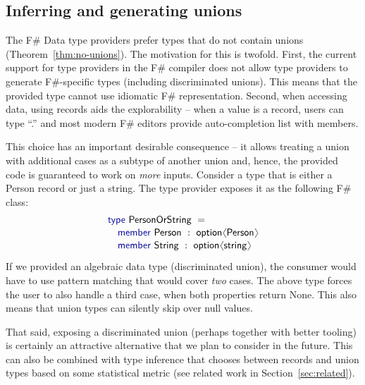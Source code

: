 \documentclass[10pt,preprint,blind,clearpagebib]{sigplanconf}
\newcommand{\langl}{\begin{picture}(4.5,7)
\put(1.1,2.5){\rotatebox{60}{\line(1,0){5.5}}}
\put(1.1,2.5){\rotatebox{300}{\line(1,0){5.5}}}
\end{picture}}
\newcommand{\rangl}{\begin{picture}(4.5,7)
\put(.9,2.5){\rotatebox{120}{\line(1,0){5.5}}}
\put(.9,2.5){\rotatebox{240}{\line(1,0){5.5}}}
\end{picture}}
\newcommand{\kvd}[1]{\textnormal{\textcolor{kvdclr}{\sffamily #1}}}
\newcommand{\ident}[1]{\textnormal{\sffamily #1}}
\begin{document}
  
\subsection{Inferring and generating unions}
\label{sec:impl-unions}

The F\# Data type providers prefer types that do not contain unions (Theorem~\ref{thm:no-unions}).
The motivation for this is twofold. First, the current support for type providers in the F\# compiler
does not allow type providers to generate F\#-specific types (including discriminated unions). This
means that the provided type cannot use idiomatic F\# representation. Second, when accessing data,
using records aids the explorability -- when a value is a record, users can type ``.'' and most modern
F\# editors provide auto-completion list with members. 

This choice has an important desirable consequence -- it allows treating a union with additional 
cases as a subtype of another union and, hence, the provided code is guaranteed to work on \emph{more}
inputs. Consider a type that is either a \ident{Person} record or just a string. 
The type provider exposes it as the following F\# class:
%
\begin{equation*}
\begin{array}{l}
 \kvd{type}~\ident{PersonOrString}~=  \\[0.1em]
 \quad \kvd{member}~\ident{Person}~:~\ident{option}\langl \ident{Person}\rangl \\[0.1em]
 \quad \kvd{member}~\ident{String}~:~\ident{option}\langl \ident{string}\rangl \\[0.1em]
\end{array}
\end{equation*}
%
If we provided an algebraic data type (discriminated union), the consumer would have to use pattern
matching that would cover \emph{two} cases. The above type forces the user to also handle a third
case, when both properties return \ident{None}. This also means that union types can silently skip
over \kvd{null} values.

That said, exposing a discriminated union (perhaps together with better tooling) is certainly an
attractive alternative that we plan to consider in the future. This can also be combined with type 
inference that chooses between records and union types based on some statistical metric (see
related work in Section~\ref{sec:related}).
\end{document}
